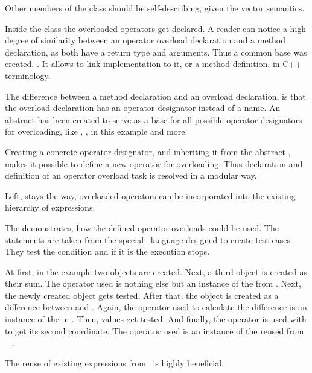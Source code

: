 Other members of the  class should be self-describing, given the vector semantics.

Inside the class the overloaded operators get declared. A reader can notice a high degree of
similarity between an operator overload declaration and a method declaration, as both 
have a return type and arguments. Thus a common base  was created, 
. It allows to link implementation to it, or a method
definition, in C++ terminology.

The difference between a method declaration and an overload declaration, is that the
overload declaration has an operator designator instead of a name. An abstract 
 has been created to serve as a base for all possible operator designators
for overloading, like \cc{+}, \cc{-}, \cc{[]} in this example and more.

Creating a concrete operator designator, and inheriting it from the abstract ,
makes it possible to define a new operator for overloading. Thus declaration and 
definition of an operator overload task is resolved in a modular way.

Left, stays the way, overloaded operators can be incorporated into the existing
hierarchy of expressions.


The  demonstrates, how the defined operator overloads could 
be used. The  statements are taken from the special \mbdr\ language designed to
create test cases. They test the condition and if it is  the execution stops.

At first, in the example two  objects are created. Next, a third object is created 
as their sum. The \cc{+} operator used is nothing else but an instance of the  from 
\mbdr. Next, the newly created  object gets tested. After that, the  object is
created as a difference between  and . Again, the operator \cc{-} used to calculate 
the difference is an instance of the  in \mbdr. Then,  values get tested. 
And finally, the \cc{[]} operator is used with  to get its second coordinate. The operator
used is an instance of the reused from \mbdr\  .

The reuse of existing expressions from \mbdr\ is highly beneficial. 

